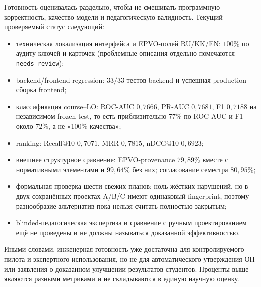\documentclass[twoside,11pt]{article}
\begin{document}
Готовность оценивалась раздельно, чтобы не смешивать программную корректность,
качество модели и педагогическую валидность. Текущий проверяемый статус следующий:
\begin{itemize}
  \item техническая локализация интерфейса и EPVO-полей RU/KK/EN: $100\%$ по
  аудиту ключей и карточек (проблемные описания отдельно помечаются
  \texttt{needs\_review});
  \item backend/frontend regression: $33/33$ тестов backend и успешная production
  сборка frontend;
  \item классификация course--LO: ROC-AUC $0{,}7666$, PR-AUC $0{,}7681$, F1
  $0{,}7188$ на независимом frozen test, то есть приблизительно $77\%$ по ROC-AUC
  и F1 около $72\%$, а не «100\% качества»;
  \item ranking: Recall@10 $0{,}7071$, MRR $0{,}7815$, nDCG@10 $0{,}6923$;
  \item внешнее структурное сравнение: EPVO-provenance $79{,}89\%$ вместе с
  нормативными элементами и $99{,}64\%$ без них; согласование семестра $80{,}95\%$;
  \item формальная проверка шести свежих планов: ноль жёстких нарушений, но в двух
  сохранённых проектах A/B/C имеют одинаковый fingerprint, поэтому разнообразие
  альтернатив пока нельзя считать полностью закрытым;
  \item blinded-педагогическая экспертиза и сравнение с ручным проектированием ещё
  не проведены и не должны называться доказанной эффективностью.
\end{itemize}
Иными словами, инженерная готовность уже достаточна для контролируемого пилота и
экспертного использования, но не для автоматического утверждения ОП или заявления
о доказанном улучшении результатов студентов. Проценты выше являются разными
метриками и не складываются в единую научную оценку.
\end{document}
